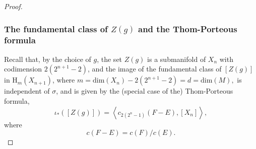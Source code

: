 \documentclass[12pt, oneside, psamsfonts]{amsart}
\theoremstyle{definition}
\theoremstyle{remark}
\numberwithin{equation}{section}
\newcommand{\Comp}{\mathbb C}
\begin{document}
\begin{proof}





\subsubsection*{The fundamental class of $Z(g)$ and the Thom-Porteous formula}
Recall that, by the choice of $g$, the set $Z(g)$ is a submanifold of $X_{n}$ with codimension $2(2^{n+1} - 2)$, and the image of the fundamental class of $[Z(g)]$ in $\mathrm{H}_{m}(X_{n+1})$,  %
where $m = \mathrm{dim}(X_{n}) - 2(2^{n+1}-2) = d =  \mathrm{dim}(M),$  
is independent of $\sigma$, and is given by the (special case of the) Thom-Porteous formula,
\begin{equation}\label{TP-identity}
\iota_*([Z(g)]) = \left< c_{2(2^n-1)}(F - E), [X_{n}]\right>,
\end{equation} 
where
$$ c(F - E) = c(F)/c(E).$$




\end{proof}
\end{document}
